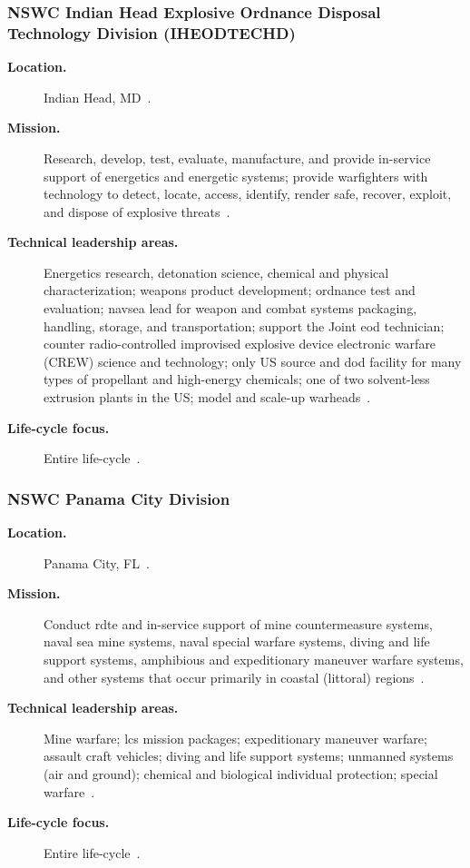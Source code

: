 \documentclass[../main.tex]{subfiles}
\begin{document}
\subsubsection{NSWC Indian Head Explosive Ordnance Disposal Technology Division (IHEODTECHD)}
\begin{description}
  \item[\textbf{Location.}] Indian Head, MD~\autocite{edo-2-1-4-warfare-centers-2024}.
  \item[\textbf{Mission.}] Research, develop, test, evaluate, manufacture, and provide in-service support of energetics and energetic systems; provide warfighters with technology to detect, locate, access, identify, render safe, recover, exploit, and dispose of explosive threats~\autocite{edo-2-1-4-warfare-centers-2024}.
  \item[\textbf{Technical leadership areas.}] Energetics research, detonation science, chemical and physical characterization; weapons product development; ordnance test and evaluation; \ac{navsea} lead for weapon and combat systems packaging, handling, storage, and transportation; support the Joint \ac{eod} technician; counter radio-controlled improvised explosive device electronic warfare (CREW) science and technology; only US source and \ac{dod} facility for many types of propellant and high-energy chemicals; one of two solvent-less extrusion plants in the US; model and scale-up warheads~\autocite{edo-2-1-4-warfare-centers-2024}.
  \item[\textbf{Life-cycle focus.}] Entire life-cycle~\autocite{edo-2-1-4-warfare-centers-2024}.
\end{description}

\subsubsection{NSWC Panama City Division}
\begin{description}
  \item[\textbf{Location.}] Panama City, FL~\autocite{edo-2-1-4-warfare-centers-2024}.
  \item[\textbf{Mission.}] Conduct \ac{rdte} and in-service support of mine countermeasure systems, naval sea mine systems, naval special warfare systems, diving and life support systems, amphibious and expeditionary maneuver warfare systems, and other systems that occur primarily in coastal (littoral) regions~\autocite{edo-2-1-4-warfare-centers-2024}.
  \item[\textbf{Technical leadership areas.}] Mine warfare; \ac{lcs} mission packages; expeditionary maneuver warfare; assault craft vehicles; diving and life support systems; unmanned systems (air and ground); chemical and biological individual protection; special warfare~\autocite{edo-2-1-4-warfare-centers-2024}.
  \item[\textbf{Life-cycle focus.}] Entire life-cycle~\autocite{edo-2-1-4-warfare-centers-2024}.
\end{description}
\end{document}
